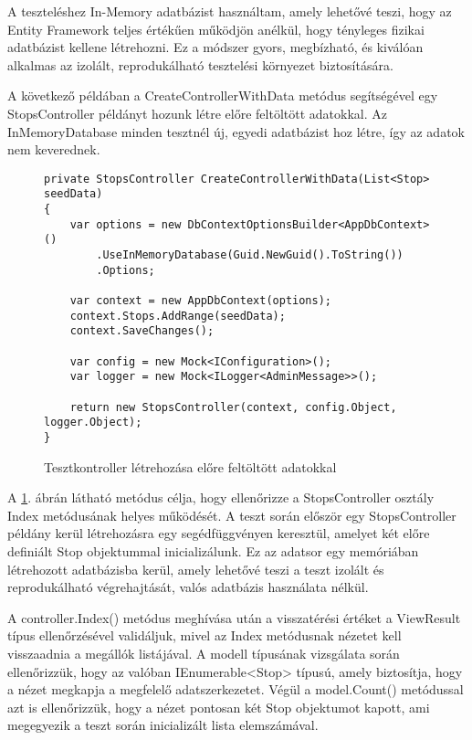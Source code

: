 A teszteléshez In-Memory adatbázist használtam, amely lehetővé teszi, hogy az Entity Framework teljes értékűen működjön anélkül, hogy tényleges fizikai adatbázist kellene létrehozni. Ez a módszer gyors, megbízható, és kiválóan alkalmas az izolált, reprodukálható tesztelési környezet biztosítására.

A következő példában a CreateControllerWithData metódus segítségével egy StopsController példányt hozunk létre előre feltöltött adatokkal. Az InMemoryDatabase minden tesztnél új, egyedi adatbázist hoz létre, így az adatok nem keverednek.

\begin{figure}[H]
\caption{Tesztkontroller létrehozása előre feltöltött adatokkal}
\label{fig:seeded-controller}
\begin{minipage}{\textwidth}
\begin{BVerbatim}
private StopsController CreateControllerWithData(List<Stop> seedData)
{
    var options = new DbContextOptionsBuilder<AppDbContext>()
        .UseInMemoryDatabase(Guid.NewGuid().ToString())
        .Options;

    var context = new AppDbContext(options);
    context.Stops.AddRange(seedData);
    context.SaveChanges();

    var config = new Mock<IConfiguration>();
    var logger = new Mock<ILogger<AdminMessage>>();

    return new StopsController(context, config.Object, logger.Object);
}
\end{BVerbatim}
\end{minipage}
\end{figure}

A \ref{fig:seeded-controller}. ábrán látható metódus célja, hogy ellenőrizze a StopsController osztály Index metódusának helyes működését. A teszt során először egy StopsController példány kerül létrehozásra egy segédfüggvényen keresztül, amelyet két előre definiált Stop objektummal inicializálunk. Ez az adatsor egy memóriában létrehozott adatbázisba kerül, amely lehetővé teszi a teszt izolált és reprodukálható végrehajtását, valós adatbázis használata nélkül.

A controller.Index() metódus meghívása után a visszatérési értéket a ViewResult típus ellenőrzésével validáljuk, mivel az Index metódusnak nézetet kell visszaadnia a megállók listájával. A modell típusának vizsgálata során ellenőrizzük, hogy az valóban IEnumerable<Stop> típusú, amely biztosítja, hogy a nézet megkapja a megfelelő adatszerkezetet. Végül a model.Count() metódussal azt is ellenőrizzük, hogy a nézet pontosan két Stop objektumot kapott, ami megegyezik a teszt során inicializált lista elemszámával.

